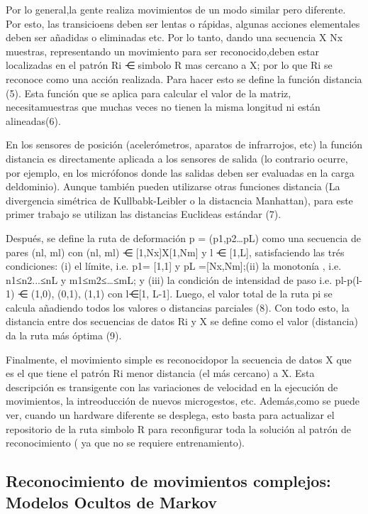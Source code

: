 \documentclass{article}
\begin{document}
Por lo general,la gente realiza movimientos de un modo similar pero diferente. Por esto, las transicioens deben ser lentas o rápidas, algunas acciones elementales deben ser añadidas o eliminadas etc. Por lo tanto, dando una secuencia X  Nx muestras, representando un movimiento para ser reconocido,deben estar localizadas en el patrón  Ri ⋲ simbolo R mas cercano a X; por lo que Ri se reconoce como una acción realizada. Para hacer esto se define la función distancia (5). Esta función que se aplica para calcular el valor de la matriz, necesitamuestras que muchas veces no tienen la misma longitud ni están alineadas(6).

En los sensores de posición (acelerómetros, aparatos de infrarrojos, etc) la función distancia es directamente aplicada a los sensores de salida (lo contrario ocurre, por ejemplo, en los micrófonos donde las salidas deben ser evaluadas en la carga deldominio). Aunque también pueden utilizarse otras funciones distancia (La divergencia simétrica de Kullbabk-Leibler o la distacncia Manhattan), para este primer trabajo se utilizan las distancias Euclideas estándar (7).


Después, se define la ruta de deformación p = (p1,p2…pL) como una secuencia de pares (nl, ml) con (nl, ml) ⋲ [1,Nx]X[1,Nm] y l ⋲ [1,L], satisfaciendo las trés condiciones: (i) el límite, i.e. p1= [1,1] y pL =[Nx,Nm];(ii) la monotonía , i.e. n1≤n2...≤nL y m1≤m2≤…≤mL; y (iii) la condición de intensidad de paso i.e. pl-p(l-1) ⋲ {(1,0), (0,1), (1,1)} con l⋲[1, L-1].
Luego, el valor total de la ruta pi se calcula añadiendo todos los valores o distancias parciales (8). Con todo esto, la distancia entre dos secuencias de datos Ri y X se define como el valor (distancia) da la ruta más óptima (9).

Finalmente, el movimiento simple es reconocidopor la secuencia de datos X que es el que tiene el patrón Ri menor distancia (el más cercano) a X. Esta descripción es transigente con las variaciones de velocidad en la ejecución de movimientos, la intreoducción de nuevos microgestos, etc. Además,como se puede ver, cuando un hardware diferente se desplega, esto basta para actualizar el repositorio de la ruta simbolo R para reconfigurar toda la solución al patrón de reconocimiento ( ya que no se requiere entrenamiento).

\subsection{Reconocimiento de movimientos complejos: Modelos Ocultos de Markov}
\end{document}
